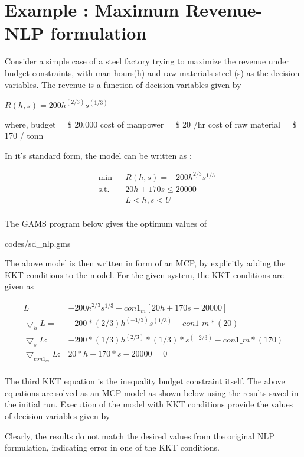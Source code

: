 \documentclass{article}
\begin{document}
\section{Example : Maximum Revenue- NLP formulation}

Consider a simple case of a steel factory trying to maximize the revenue under budget constraints, with man-hours(h) and raw materials steel (s) as the decision variables. The revenue is a function of decision variables given by

\centerline{$R(h,s) = 200 h^{(2/3)}s^{(1/3)} $ }
\bigbreak
\noindent where, budget = \$ 20,000
cost of manpower = \$ 20 /hr
cost of raw material = \$ 170 / tonn

\noindent In it's standard form, the model can be written as :

\begin{equation}
\begin{aligned}
&	\min
& & R(h,s) = - 200 h^{2/3}s^{1/3}  \\
& \text{s.t.} & & 	 20h + 170s \leq 20000 \\
& & &			L< h,s < U   \\
\end{aligned}
\end{equation}

The GAMS program below gives the optimum values of 

 {codes/sd_nlp.gms}

\noindent The above model is then written in form of an MCP, by explicitly adding the KKT conditions to the model. For the given system, the KKT conditions are given as

\begin{equation}
\begin{aligned}
 L = & - 200 h^{2/3}s^{1/3} - con1_m [ 20h + 170 s - 20000]	\\
 \bigtriangledown _h L = & - 200* (2/3) h^{(-1/3)}  s^{(1/3)} - con1\_m*(20)  	\\
 \bigtriangledown _s L:  & - 200 * (1 / 3) h^{(2/3)} *(1/3) *  s^{(-2/3)} - con1\_m*(170)   \\
 \bigtriangledown _{con1_m} L : &   20*h + 170 * s - 20000 =0 \\
\end{aligned}
\end{equation}

\noindent The third KKT equation is the inequality budget constraint itself. The above equations are solved as an MCP model as shown below using the results saved in the initial run. Execution of the model with KKT conditions provide the values of decision variables given by



Clearly, the results do not match the desired values from the original NLP formulation, indicating error in one of the KKT conditions.
\end{document}
